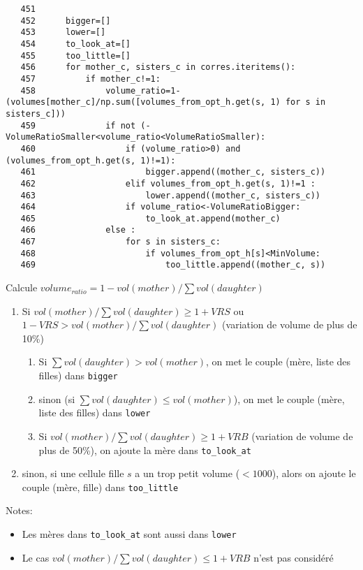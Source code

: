 \documentclass{article}
\def \mycolor {red}
\begin{document}
\color{black}
\begin{verbatim} 
   451	
   452	    bigger=[]
   453	    lower=[]
   454	    to_look_at=[]
   455	    too_little=[]
   456	    for mother_c, sisters_c in corres.iteritems():
   457	        if mother_c!=1:
   458	            volume_ratio=1-(volumes[mother_c]/np.sum([volumes_from_opt_h.get(s, 1) for s in sisters_c]))
   459	            if not (-VolumeRatioSmaller<volume_ratio<VolumeRatioSmaller):
   460	                if (volume_ratio>0) and (volumes_from_opt_h.get(s, 1)!=1):
   461	                    bigger.append((mother_c, sisters_c))
   462	                elif volumes_from_opt_h.get(s, 1)!=1 :
   463	                    lower.append((mother_c, sisters_c))
   464	                if volume_ratio<-VolumeRatioBigger:
   465	                    to_look_at.append(mother_c)
   466	            else :
   467	                for s in sisters_c:
   468	                    if volumes_from_opt_h[s]<MinVolume:
   469	                        too_little.append((mother_c, s))
\end{verbatim} 
\color{\mycolor}
Calcule $volume_{ratio} = 1 - vol(mother) / \sum vol(daughter)$
\begin{enumerate}
\itemsep -1ex
\item Si $vol(mother) / \sum vol(daughter) \geq 1 + VRS$ ou $1 - VRS > vol(mother) / \sum vol(daughter)$ (variation de volume de plus de 10\%)
\begin{enumerate}
\item Si $\sum vol(daughter) > vol(mother)$, on met le couple (m\`ere, liste des filles) dans \verb|bigger|
\item sinon (si $\sum vol(daughter) \leq vol(mother)$), on met le couple (m\`ere, liste des filles) dans \verb|lower|
\item Si $vol(mother) / \sum vol(daughter) \geq 1 + VRB$ (variation de volume de plus de 50\%), on ajoute la m\`ere dans \verb|to_look_at|
\end{enumerate}
\item sinon, si une cellule fille $s$ a un trop petit volume ($<1000$), alors on ajoute le couple (m\`ere, fille) dans \verb|too_little|
\end{enumerate}
Notes:
\begin{itemize}
\itemsep -1ex
\item Les m\`eres dans  \verb|to_look_at| sont aussi dans \verb|lower|
\item Le cas $vol(mother) / \sum vol(daughter) \leq 1 + VRB$ n'est pas consid\'er\'e
\end{itemize}
\end{document}
